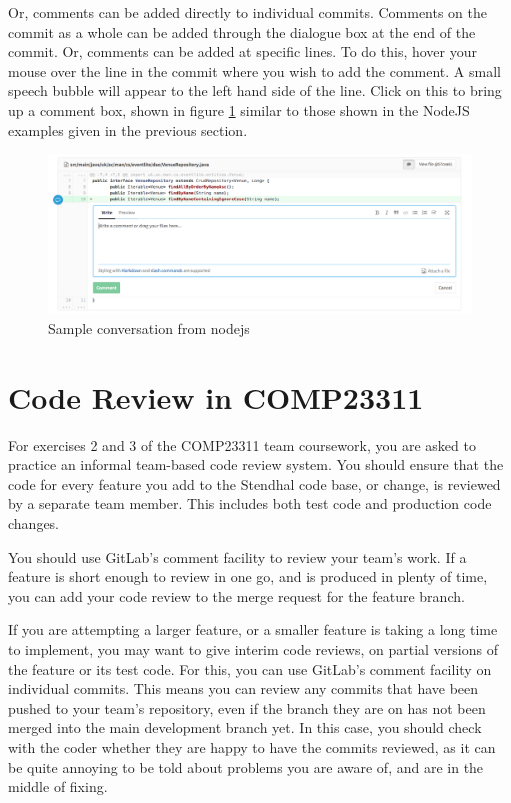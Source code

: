 \documentclass[
]{book}
\begin{document}
Or, comments can be added directly to individual commits. Comments on the commit as a whole can be added through the dialogue box at the end of the commit. Or, comments can be added at specific lines. To do this, hover your mouse over the line in the commit where you wish to add the comment. A small speech bubble will appear to the left hand side of the line. Click on this to bring up a comment box, shown in figure \ref{fig:comment-commit-fig} similar to those shown in the NodeJS examples given in the previous section.

\begin{figure}

{\centering \includegraphics[width=1\linewidth]{images/comment_commit} 

}

\caption{Sample conversation from nodejs}\label{fig:comment-commit-fig}
\end{figure}

\hypertarget{crcourse}{%
\section{Code Review in COMP23311}\label{crcourse}}

For exercises 2 and 3 of the COMP23311 team coursework, you are asked to practice an informal team-based code review system. You should ensure that the code for every feature you add to the Stendhal code base, or change, is reviewed by a separate team member. This includes both test code and production code changes.

You should use GitLab's comment facility to review your team's work. If a feature is short enough to review in one go, and is produced in plenty of time, you can add your code review to the merge request for the feature branch.

If you are attempting a larger feature, or a smaller feature is taking a long time to implement, you may want to give interim code reviews, on partial versions of the feature or its test code. For this, you can use GitLab's comment facility on individual commits. This means you can review any commits that have been pushed to your team's repository, even if the branch they are on has not been merged into the main development branch yet. In this case, you should check with the coder whether they are happy to have the commits reviewed, as it can be quite annoying to be told about problems you are aware of, and are in the middle of fixing.
\end{document}
